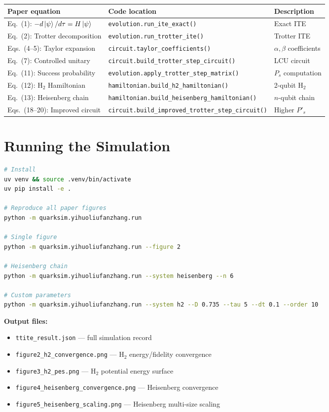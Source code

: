 \documentclass[11pt,a4paper]{article}
\begin{document}
\begin{center}
\begin{tabular}{lll}
\toprule
Paper equation & Code location & Description \\
\midrule
Eq.~(1): $-d\ket{\psi}/d\tau = H\ket{\psi}$ & \texttt{evolution.run\_ite\_exact()} & Exact ITE \\
Eq.~(2): Trotter decomposition & \texttt{evolution.run\_trotter\_ite()} & Trotter ITE \\
Eqs.~(4--5): Taylor expansion & \texttt{circuit.taylor\_coefficients()} & $\alpha, \beta$ coefficients \\
Eq.~(7): Controlled unitary & \texttt{circuit.build\_trotter\_step\_circuit()} & LCU circuit \\
Eq.~(11): Success probability & \texttt{evolution.apply\_trotter\_step\_matrix()} & $P_s$ computation \\
Eq.~(12): H$_2$ Hamiltonian & \texttt{hamiltonian.build\_h2\_hamiltonian()} & 2-qubit H$_2$ \\
Eq.~(13): Heisenberg chain & \texttt{hamiltonian.build\_heisenberg\_hamiltonian()} & $n$-qubit chain \\
Eqs.~(18--20): Improved circuit & \texttt{circuit.build\_improved\_trotter\_step\_circuit()} & Higher $P'_s$ \\
\bottomrule
\end{tabular}
\end{center}


\section{Running the Simulation}

\begin{lstlisting}[language=bash]
# Install
uv venv && source .venv/bin/activate
uv pip install -e .

# Reproduce all paper figures
python -m quarksim.yihuoliufanzhang.run

# Single figure
python -m quarksim.yihuoliufanzhang.run --figure 2

# Heisenberg chain
python -m quarksim.yihuoliufanzhang.run --system heisenberg --n 6

# Custom parameters
python -m quarksim.yihuoliufanzhang.run --system h2 --D 0.735 --tau 5 --dt 0.1 --order 10
\end{lstlisting}

\textbf{Output files:}
\begin{itemize}[nosep]
  \item \texttt{ttite\_result.json} --- full simulation record
  \item \texttt{figure2\_h2\_convergence.png} --- H$_2$ energy/fidelity convergence
  \item \texttt{figure3\_h2\_pes.png} --- H$_2$ potential energy surface
  \item \texttt{figure4\_heisenberg\_convergence.png} --- Heisenberg convergence
  \item \texttt{figure5\_heisenberg\_scaling.png} --- Heisenberg multi-size scaling
\end{itemize}
\end{document}
